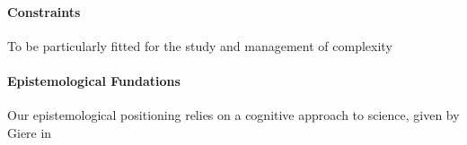 \documentclass[runningheads,a4paper]{llncs2e/llncs}
\begin{document}
\paragraph{Constraints}

To be particularly fitted for the study and management of complexity




\paragraph{Epistemological Fundations}

Our epistemological positioning relies on a cognitive approach to science, given by Giere in~\cite{giere2010explaining}


\end{document}
